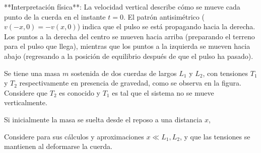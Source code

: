 \documentclass[
  11pt,
  letterpaper,
   addpoints,
   answers
  ]{exam}
\begin{document}
\begin{questions}
\begin{solution}
  **Interpretación física**: La velocidad vertical describe cómo se mueve cada punto de la cuerda en el instante $t = 0$. El patrón antisimétrico ($v(-x,0) = -v(x,0)$) indica que el pulso se está propagando hacia la derecha. Los puntos a la derecha del centro se mueven hacia arriba (preparando el terreno para el pulso que llega), mientras que los puntos a la izquierda se mueven hacia abajo (regresando a la posición de equilibrio después de que el pulso ha pasado).
\end{solution}

\question Se tiene una masa $m$ sostenida de dos cuerdas de largos $L_1$ y $L_2$, con tensiones $T_1$ y $T_2$ respectivamente en presencia de gravedad, como se observa en la figura. Considere que $T_2$ es conocido y $T_1$ es tal que el sistema no se mueve verticalmente.

Si inicialmente la masa se suelta desde el reposo a una distancia $x$,
Considere para sus cálculos y aproximaciones $x \ll L_1, L_2$, y que las tensiones se mantienen al deformarse la cuerda.
\begin{figure}[H]
\centering
{}
\end{figure}
\end{questions}
\end{document}
